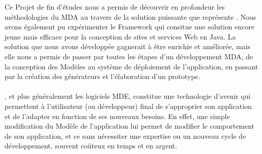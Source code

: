 Ce Projet de fin d'études nous a permis de découvrir en profondeur les méthodologies du MDA au travers de la solution puissante que représente \kwacceleo. Nous avons également pu expérimenter le Framework \kwplay qui consitue une solution encore jeune mais efficace pour la conception de sites et services Web en Java. La solution que nous avons développée gagnerait à être enrichie et améliorée, mais elle nous a permis de passer par toutes les étapes d'un développement MDA, de la conception des Modèles au système de déploiement de l'application, en passant par la création des générateurs et l'élaboration d'un prototype.
\\
\\
\kwacceleo{}, et plus généralement les logiciels MDE, constitue une technologie d'avenir qui permettent à l'utilisateur (ou développeur) final de s'approprier son application et de l'adapter en fonction de ses nouveaux besoins. En effet, une simple modification du Modèle de l'application lui permet de modifier le comportement de son application, et ce sans nécessiter une expertise ou un nouveau cycle de développement, souvent coûteux en temps et en argent.



